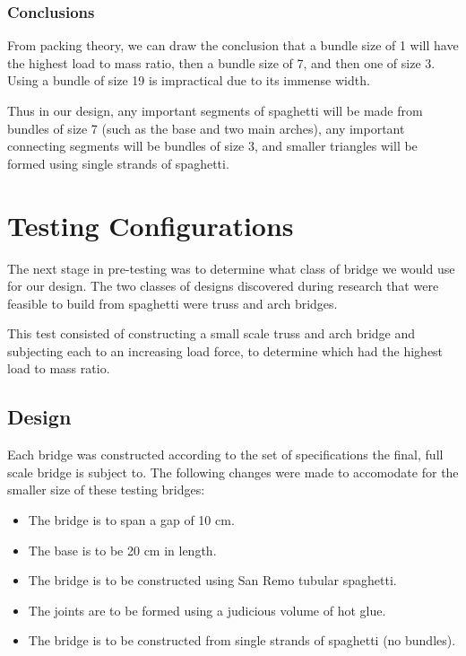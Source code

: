 \documentclass[a4paper,11pt]{article}
\begin{document}
\subsubsection{Conclusions}

From packing theory, we can draw the conclusion that a bundle size of 1 will
have the highest load to mass ratio, then a bundle size of 7, and then one of
size 3.
Using a bundle of size 19 is impractical due to its immense width.

Thus in our design, any important segments of spaghetti will be made from
bundles of size 7 (such as the base and two main arches), any important
connecting segments will be bundles of size 3, and smaller triangles will be
formed using single strands of spaghetti.




\section{Testing Configurations}

The next stage in pre-testing was to determine what class of bridge we would use
for our design.
The two classes of designs discovered during research that were feasible to
build from spaghetti were truss and arch bridges.

This test consisted of constructing a small scale truss and arch bridge and
subjecting each to an increasing load force, to determine which had the highest
load to mass ratio.


\subsection{Design}

Each bridge was constructed according to the set of specifications the final,
full scale bridge is subject to. The following changes were made to accomodate
for the smaller size of these testing bridges:

\begin{itemize}
\item The bridge is to span a gap of 10 cm.
\item The base is to be 20 cm in length.
\item The bridge is to be constructed using San Remo tubular spaghetti.
\item The joints are to be formed using a judicious volume of hot glue.
\item The bridge is to be constructed from single strands of spaghetti (no
	bundles).
\end{itemize}
\end{document}
